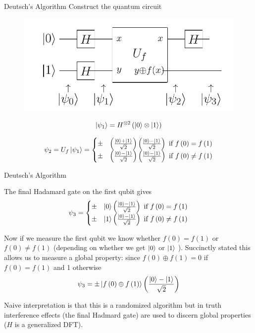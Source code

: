 \documentclass{beamer}
\begin{document}
\begin{frame}{Deutsch's Algorithm}
Construct the quantum circuit
\begin{figure}[ht]
  \includegraphics[scale=0.33]{pasted1}
\end{figure}
\[
\Ket{\psi_{1}} = H^{\otimes2}\left(\Ket{0}\otimes\Ket{1}\right)
\]

\[
\psi_{2}=U_{f}\Ket{\psi_{1}}=\begin{cases}
\pm & \left(\frac{\Ket{0}+\Ket{1}}{\sqrt{2}}\right)\left(\frac{\Ket{0}-\Ket{1}}{\sqrt{2}}\right)\text{ if }f\left(0\right)=f\left(1\right)\\
\pm & \left(\frac{\Ket{0}-\Ket{1}}{\sqrt{2}}\right)\left(\frac{\Ket{0}-\Ket{1}}{\sqrt{2}}\right)\text{ if }f\left(0\right)\neq f\left(1\right)
\end{cases}
\]

\end{frame}


\begin{frame}{Deutsch's Algorithm}

The final Hadamard gate on the first qubit gives
\[
\psi_{3}=\begin{cases}
\pm & \Ket{0}\left(\frac{\Ket{0}-\Ket{1}}{\sqrt{2}}\right)\text{ if }f\left(0\right)=f\left(1\right)\\
\pm & \Ket{1}\left(\frac{\Ket{0}-\Ket{1}}{\sqrt{2}}\right)\text{ if }f\left(0\right)\neq f\left(1\right)
\end{cases}
\]

Now if we measure the first qubit we know whether $f\left(0\right)=f\left(1\right)$
or $f\left(0\right)\neq f\left(1\right)$ (depending on whether we get $\Ket{0}$ or $\Ket{1}$ ). Succinctly stated this allows us to measure a global property: since $f\left(0\right)\oplus f\left(1\right)=0$ if $f\left(0\right)=f\left(1\right)$ and 1 otherwise
\[
\psi_{3}=\pm\Ket{f\left(0\right)\oplus f\left(1\right)}\left(\frac{\Ket{0}-\Ket{1}}{\sqrt{2}}\right)
\] 

Naive interpretation is that this is a randomized algorithm but in truth interference effects (the final Hadmard gate)
are used to discern global properties ($H$ is a generalized DFT).
 

\end{frame}
\end{document}

